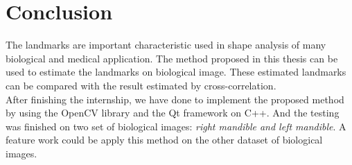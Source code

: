 \chapter{Conclusion}
\indent The landmarks are important characteristic used in shape analysis of many biological and medical application. The method proposed in this thesis can be used to estimate the landmarks on biological image. These estimated landmarks can be compared with the result estimated by cross-correlation.\\[0.2cm]
\indent After finishing the internship, we have done to implement the proposed method by using the OpenCV library and the Qt framework on C++. And the testing was finished on two set of biological images: \textit{right mandible and left mandible}. A feature work could be apply this method on the other dataset of biological images.